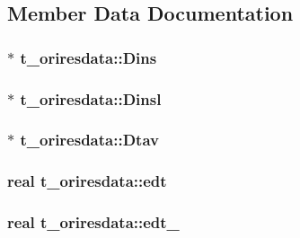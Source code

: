 \subsection{\-Member \-Data \-Documentation}
\hypertarget{structt__oriresdata_a7ccbcf3d3073e1b98165903add5ca124}{
\subsubsection[{\-Dins}]{ $\ast$ {\bf t\-\_\-oriresdata\-::\-Dins}}}\label{structt__oriresdata_a7ccbcf3d3073e1b98165903add5ca124}
\hypertarget{structt__oriresdata_accceb8718335bbda8b979d6230864528}{
\subsubsection[{\-Dinsl}]{ $\ast$ {\bf t\-\_\-oriresdata\-::\-Dinsl}}}\label{structt__oriresdata_accceb8718335bbda8b979d6230864528}
\hypertarget{structt__oriresdata_a2dfa9db1fc65e8dba892059412ac2d57}{
\subsubsection[{\-Dtav}]{ $\ast$ {\bf t\-\_\-oriresdata\-::\-Dtav}}}\label{structt__oriresdata_a2dfa9db1fc65e8dba892059412ac2d57}
\hypertarget{structt__oriresdata_ac62c4c96f4e26c89a5064d59eb731297}{
\subsubsection[{edt}]{\setlength{\rightskip}{0pt plus 5cm}real {\bf t\-\_\-oriresdata\-::edt}}}\label{structt__oriresdata_ac62c4c96f4e26c89a5064d59eb731297}
\hypertarget{structt__oriresdata_a129d5bae4c3e45c575cba5061f280252}{
\subsubsection[{edt\-\_\-1}]{\setlength{\rightskip}{0pt plus 5cm}real {\bf t\-\_\-oriresdata\-::edt\-\_}}}\label{structt__oriresdata_a129d5bae4c3e45c575cba5061f280252}
